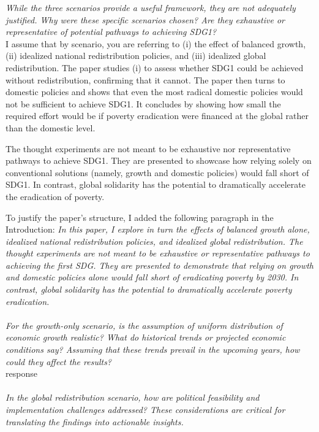 \documentclass[12pt,english]{article}
\begin{document}
\textit{While the three scenarios provide a useful framework, they are not adequately justified. Why were these specific scenarios chosen? Are they exhaustive or representative of potential pathways to achieving SDG1? }~\\

I assume that by scenario, you are referring to (i) the effect of balanced growth, (ii) idealized national redistribution policies, and (iii) idealized global redistribution. The paper studies (i) to assess whether SDG1 could be achieved without redistribution, confirming that it cannot. The paper then turns to domestic policies and shows that even the most radical domestic policies would not be sufficient to achieve SDG1. It concludes by showing how small the required effort would be if poverty eradication were financed at the global rather than the domestic level. 

The thought experiments are not meant to be exhaustive nor representative pathways to achieve SDG1. They are presented to showcase how relying solely on conventional solutions (namely, growth and domestic policies) would fall short of SDG1. In contrast, global solidarity has the potential to dramatically accelerate the eradication of poverty.

To justify the paper's structure, I added the following paragraph in the Introduction: \textit{In this paper, I explore in turn the effects of balanced growth alone, idealized national redistribution policies, and idealized global redistribution. The thought experiments are not meant to be exhaustive or representative pathways to achieving the first SDG. They are presented to demonstrate that relying on growth and domestic policies alone would fall short of eradicating poverty by 2030. In contrast, global solidarity has the potential to dramatically accelerate poverty eradication.}
~\\ ~\\

\textit{For the growth-only scenario, is the assumption of uniform distribution of economic growth realistic? What do historical trends or projected economic conditions say? Assuming that these trends prevail in the upcoming years, how could they affect the results? }~\\

response
~\\ ~\\

\textit{In the global redistribution scenario, how are political feasibility and implementation challenges addressed? These considerations are critical for translating the findings into actionable insights. }~\\
\end{document}
